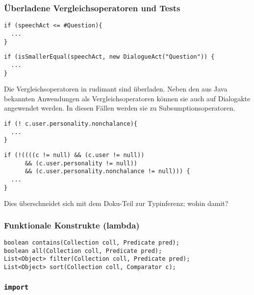 \subsubsection{Überladene Vergleichsoperatoren und Tests}

\begin{minipage}{0.4\textwidth}
\begin{verbatim}
if (speechAct <= #Question){
  ...
}
\end{verbatim}
\end{minipage}
\begin{minipage}{0.6\textwidth}
\begin{verbatim}
if (isSmallerEqual(speechAct, new DialogueAct("Question")) {
  ...
}
\end{verbatim}
\end{minipage}
\newline
Die Vergleichsoperatoren in rudimant sind überladen. Neben den aus Java bekannten Anwendungen als Vergleichsoperatoren können sie auch auf Dialogakte angewendet werden. In diesen Fällen werden sie zu Subsumptionsoperatoren.

\begin{minipage}{0.4\textwidth}
\begin{verbatim}
if (! c.user.personality.nonchalance){
  ...
}
\end{verbatim}
\end{minipage}
\begin{minipage}{0.6\textwidth}
\begin{verbatim}
if (!((((c != null) && (c.user != null))
      && (c.user.personality != null))
      && (c.user.personality.nonchalance != null))) {
  ...
}
\end{verbatim}
\end{minipage}

Dies überschneidet sich mit dem Doku-Teil zur Typinferenz; wohin damit?

\subsubsection{Funktionale Konstrukte (lambda)}
\begin{verbatim}
boolean contains(Collection coll, Predicate pred);
boolean all(Collection coll, Predicate pred);
List<Object> filter(Collection coll, Predicate pred);
List<Object> sort(Collection coll, Comparator c);
\end{verbatim}

\subsubsection{\texttt{import}}

